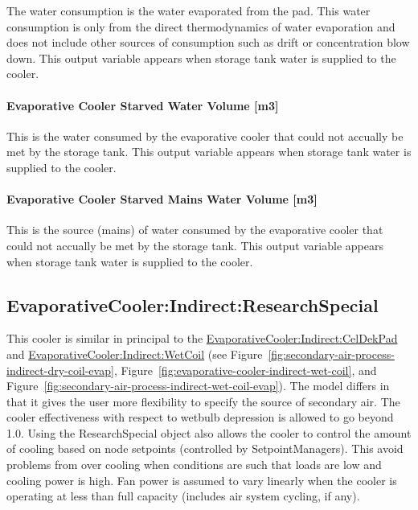 The water consumption is the water evaporated from the pad. This water consumption is only from the direct thermodynamics of water evaporation and does not include other sources of consumption such as drift or concentration blow down. This output variable appears when storage tank water is supplied to the cooler.

\paragraph{Evaporative Cooler Starved Water Volume {[}m3{]}}\label{evaporative-cooler-starved-water-volume-m3-3}

This is the water consumed by the evaporative cooler that could not accually be met by the storage tank. This output variable appears when storage tank water is supplied to the cooler.

\paragraph{Evaporative Cooler Starved Mains Water Volume {[}m3{]}}\label{evaporative-cooler-starved-mains-water-volume-m3-3}

This is the source (mains) of water consumed by the evaporative cooler that could not accually be met by the storage tank. This output variable appears when storage tank water is supplied to the cooler.

\subsection{EvaporativeCooler:Indirect:ResearchSpecial}\label{evaporativecoolerindirectresearchspecial}

This cooler is similar in principal to the \hyperref[evaporativecoolerindirectceldekpad]{EvaporativeCooler:Indirect:CelDekPad} and \hyperref[evaporativecoolerindirectwetcoil]{EvaporativeCooler:Indirect:WetCoil} (see Figure~\ref{fig:secondary-air-process-indirect-dry-coil-evap}, Figure~\ref{fig:evaporative-cooler-indirect-wet-coil}, and Figure~\ref{fig:secondary-air-process-indirect-wet-coil-evap}). The model differs in that it gives the user more flexibility to specify the source of secondary air. The cooler effectiveness with respect to wetbulb depression is allowed to go beyond 1.0. Using the ResearchSpecial object also allows the cooler to control the amount of cooling based on node setpoints (controlled by SetpointManagers). This avoid problems from over cooling when conditions are such that loads are low and cooling power is high. Fan power is assumed to vary linearly when the cooler is operating at less than full capacity (includes air system cycling, if any).

